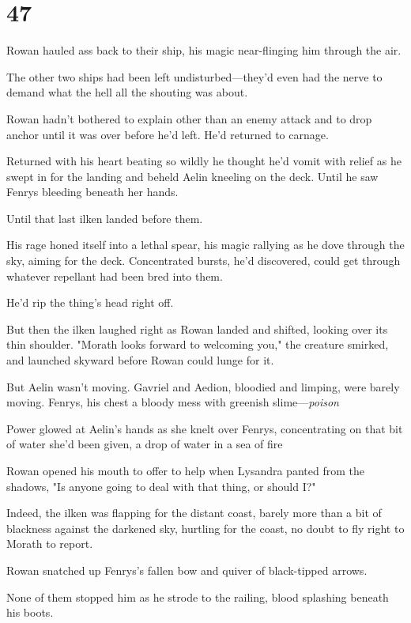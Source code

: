 
\chapter{47}

Rowan hauled ass back to their ship, his magic near-flinging him through the air.

The other two ships had been left undisturbed---they'd even had the nerve to demand what the hell all the shouting was about.

Rowan hadn't bothered to explain other than an enemy attack and to drop anchor until it was over before he'd left. He'd returned to carnage.

Returned with his heart beating so wildly he thought he'd vomit with relief as he swept in for the landing and beheld Aelin kneeling on the deck. Until he saw Fenrys bleeding beneath her hands.

Until that last ilken landed before them.

His rage honed itself into a lethal spear, his magic rallying as he dove through the sky, aiming for the deck. Concentrated bursts, he'd discovered, could get through whatever repellant had been bred into them.

He'd rip the thing's head right off.

But then the ilken laughed right as Rowan landed and shifted, looking over its thin shoulder. "Morath looks forward to welcoming you," the creature smirked, and launched skyward before Rowan could lunge for it.

But Aelin wasn't moving. Gavriel and Aedion, bloodied and limping, were barely moving. Fenrys, his chest a bloody mess with greenish slime---\emph{poison} 

Power glowed at Aelin's hands as she knelt over Fenrys, concentrating on that bit of water she'd been given, a drop of water in a sea of fire


Rowan opened his mouth to offer to help when Lysandra panted from the shadows, "Is anyone going to deal with that thing, or should I?"

Indeed, the ilken was flapping for the distant coast, barely more than a bit of blackness against the darkened sky, hurtling for the coast, no doubt to fly right to Morath to report.

Rowan snatched up Fenrys's fallen bow and quiver of black-tipped arrows.

None of them stopped him as he strode to the railing, blood splashing beneath his boots.

